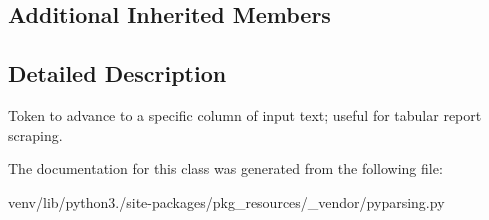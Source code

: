 \subsection*{Additional Inherited Members}


\subsection{Detailed Description}
\begin{DoxyVerb}Token to advance to a specific column of input text; useful for tabular report scraping.
\end{DoxyVerb}
 

The documentation for this class was generated from the following file\+:\begin{DoxyCompactItemize}
\item 
venv/lib/python3./site-\/packages/pkg\+\_\+resources/\+\_\+vendor/pyparsing.\+py\end{DoxyCompactItemize}
